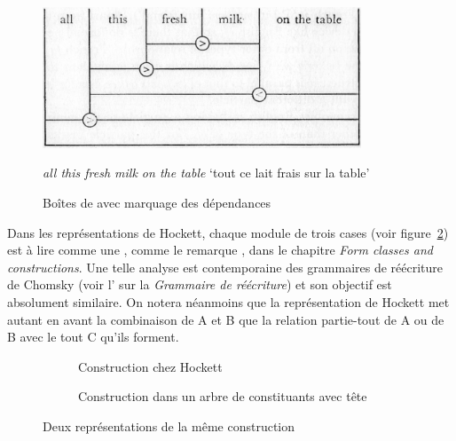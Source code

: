 {    \begin{figure}[H]
        \includegraphics[width=9.5cm]{figures/vol1syntaxe2-img025.png}
        \caption{Boîtes de \cites [188]{hockett1958course} avec marquage des dépendances\label{fig:hockett2}}
        \small\textit{all this fresh milk on the table} ‘tout ce lait frais sur la table’
    \end{figure}
        
    Dans les représentations de Hockett, chaque module de trois cases (voir figure~\ref{fig:hockett3}) est à lire comme une , comme le remarque \citet[161]{hockett1958course}, dans le chapitre \textit{Form classes and constructions}. Une telle analyse est contemporaine des grammaires de réécriture de Chomsky (voir l’ sur la \textit{Grammaire de réécriture}) et son objectif est absolument similaire. On notera néanmoins que la représentation de Hockett met autant en avant la combinaison de A et B que la relation partie-tout de A ou de B avec le tout C qu’ils forment.    
    
    \begin{figure}[H]
    \begin{subfigure}[t]{.5\textwidth}\centering
    \caption{Construction chez Hockett}
    \end{subfigure}\begin{subfigure}[t]{.5\textwidth}\centering
        \caption{Construction dans un arbre de constituants avec tête}
    \end{subfigure}
    \caption{{Deux représentations de la même construction}\label{fig:hockett3}}
    \end{figure}   

}
